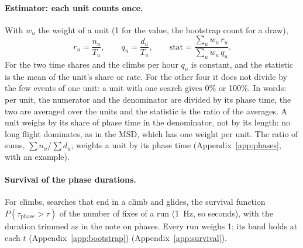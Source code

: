 \paragraph{Estimator: each unit counts once.} With $w_u$ the weight of a unit (1 for the value, the bootstrap count for a draw),
\begin{equation}\label{eq:estimator}
  r_u=\frac{n_u}{T_u},\qquad q_u=\frac{d_u}{T_u},\qquad
  \text{stat}=\frac{\sum_u w_u\, r_u}{\sum_u w_u\, q_u}.
\end{equation}
For the two time shares and the climbs per hour $q_u$ is constant, and the statistic is the mean of the unit's share or rate. For the
other four it does not divide by the few events of one unit: a unit with one search gives 0\% or 100\%.
In words: per unit, the numerator and the denominator are divided by its phase time, the two are averaged over the units and the statistic is the ratio of the averages.
A unit weighs by its share of phase time in the denominator, not by its length: no long flight dominates, as in the MSD, which has one weight per unit. The ratio of sums, $\sum n_u/\sum d_u$, weights a unit by its phase time
(Appendix~\ref{app:phases}, with an example).

\paragraph{Survival of the phase durations.} For climbs, searches that end in a climb and glides, the survival function
$P(\tau_\text{phase}>\tau)$ of the number of fixes of a run (1~Hz, so seconds), with the duration trimmed as in the
note on phases. Every run weighs 1; its band holds at each $t$ (Appendix~\ref{app:bootstrap})
(Appendix~\ref{app:survival}).
